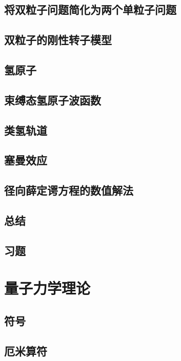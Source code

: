 \documentclass{book}
\begin{document}
	\section{将双粒子问题简化为两个单粒子问题}
	
	\section{双粒子的刚性转子模型}
	
	\section{氢原子}
	
	\section{束缚态氢原子波函数}
	
	\section{类氢轨道}
	
	\section{塞曼效应}
	
	\section{径向薛定谔方程的数值解法}
	
	\section*{总结}
	
	\section*{习题}
	
	\chapter{量子力学理论}
	\section{符号}
	
	\section{厄米算符}
	
\end{document}
